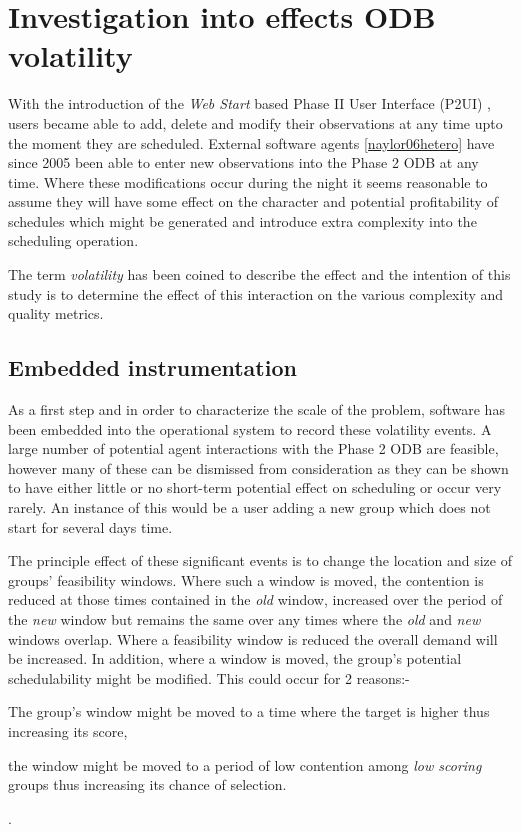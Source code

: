 \section{Investigation into effects ODB volatility}
\label{sect:exp_volatility}

With the introduction of the \emph{Web Start} based Phase II User Interface (P2UI) \cite{smith10switching}, users became able to add, delete and modify their observations at any time upto the moment they are scheduled. External software agents \ref{naylor06hetero} have since 2005 been able to enter new observations into the Phase 2 ODB at any time. Where these modifications occur during the night it seems reasonable to assume they will have some effect on the character and potential profitability of schedules which might be generated and introduce extra complexity into the scheduling operation.


The term \emph{volatility} has been coined to describe the effect and the intention of this study is to determine the effect of this interaction on the various complexity and quality metrics.

\subsection{Embedded instrumentation}
As a first step and in order to characterize the scale of the problem, software has been embedded into the operational system to record these volatility events. A large number of potential agent interactions with the Phase 2 ODB are feasible, however many of these can be dismissed from consideration as they can be shown to have either little or no short-term potential effect on scheduling or occur very rarely. An instance of this would be a user adding a new group which does not start for several days time.

The principle effect of these significant events is to change the location and size of groups' feasibility windows. Where such a window is moved, the contention is reduced at those times contained in the \emph{old} window, increased over the period of the \emph{new} window but remains the same over any times where the \emph{old} and \emph{new} windows overlap. Where a feasibility window is reduced the overall demand will be increased. In addition, where a window is moved, the group's potential schedulability might be modified. This could occur for 2 reasons:- \begin{inparaenum} \item The group's window might be moved to a time where the target is higher thus increasing its score, \item the window might be moved to a period of low contention among \emph{low scoring} groups thus increasing its chance of selection.\end{inparaenum}.

